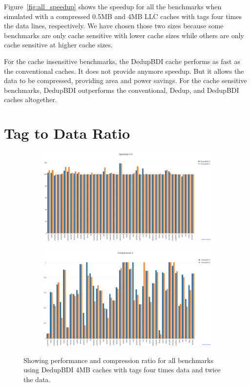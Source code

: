 Figure~\ref{fig:all_speedup} shows the speedup for all the benchmarks when simulated with a compressed 0.5MB and 4MB LLC caches with tags four times the data lines, respectively. We have chosen those two sizes because some benchmarks are only cache sensitive with lower cache sizes while others are only cache sensitive at higher cache sizes.\par
For the cache insensitive benchmarks, the DedupBDI cache performs as fast as the conventional caches. It does not provide anymore speedup. But it allows the data to be compressed, providing area and power savings. For the cache sensitive benchmarks, DedupBDI outperforms the conventional, Dedup, and DedupBDI caches altogether.

\section{Tag to Data Ratio}
\label{sec:tagratio}
\begin{figure}
    \begin{subfigure}{\textwidth}
        \includegraphics[width=\textwidth]{compare-speedup.png}
    \end{subfigure}
    \begin{subfigure}{\textwidth}
        \includegraphics[width=\textwidth]{compare-compression.png}
    \end{subfigure}
    \caption[All benchmarks: Tag Ratio]{Showing performance and compression ratio for all benchmarks using DedupBDI 4MB caches with tags four times data and twice the data.}
    \label{fig:all_compare}
\end{figure}
